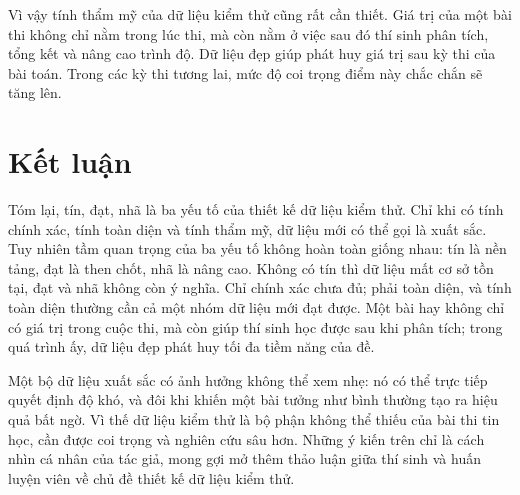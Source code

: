 \documentclass[11pt]{article}
\begin{document}
Vì vậy tính thẩm mỹ của dữ liệu kiểm thử cũng rất cần thiết. Giá trị của một
bài thi không chỉ nằm trong lúc thi, mà còn nằm ở việc sau đó thí sinh phân
tích, tổng kết và nâng cao trình độ. Dữ liệu đẹp giúp phát huy giá trị sau kỳ
thi của bài toán. Trong các kỳ thi tương lai, mức độ coi trọng điểm này chắc
chắn sẽ tăng lên.

\section{Kết luận}

Tóm lại, tín, đạt, nhã là ba yếu tố của thiết kế dữ liệu kiểm thử. Chỉ khi có
tính chính xác, tính toàn diện và tính thẩm mỹ, dữ liệu mới có thể gọi là xuất
sắc. Tuy nhiên tầm quan trọng của ba yếu tố không hoàn toàn giống nhau: tín là
nền tảng, đạt là then chốt, nhã là nâng cao. Không có tín thì dữ liệu mất cơ
sở tồn tại, đạt và nhã không còn ý nghĩa. Chỉ chính xác chưa đủ; phải toàn
diện, và tính toàn diện thường cần cả một nhóm dữ liệu mới đạt được. Một bài
hay không chỉ có giá trị trong cuộc thi, mà còn giúp thí sinh học được sau khi
phân tích; trong quá trình ấy, dữ liệu đẹp phát huy tối đa tiềm năng của đề.

Một bộ dữ liệu xuất sắc có ảnh hưởng không thể xem nhẹ: nó có thể trực tiếp
quyết định độ khó, và đôi khi khiến một bài tưởng như bình thường tạo ra hiệu
quả bất ngờ. Vì thế dữ liệu kiểm thử là bộ phận không thể thiếu của bài thi
tin học, cần được coi trọng và nghiên cứu sâu hơn. Những ý kiến trên chỉ là
cách nhìn cá nhân của tác giả, mong gợi mở thêm thảo luận giữa thí sinh và
huấn luyện viên về chủ đề thiết kế dữ liệu kiểm thử.
\end{document}
